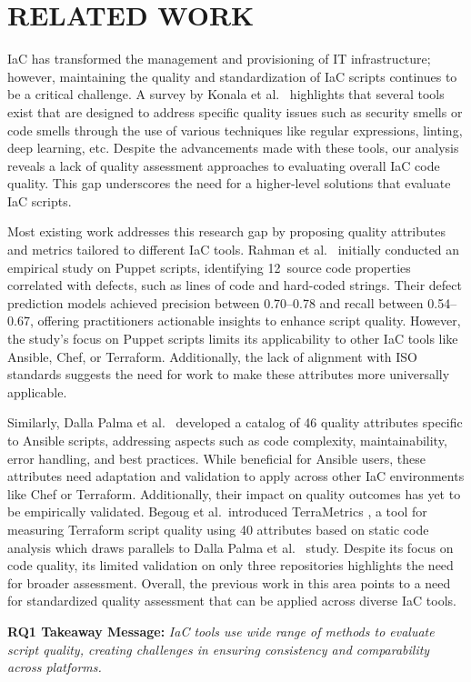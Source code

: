 \section{RELATED WORK}
IaC has transformed the management and provisioning of IT infrastructure; however, maintaining the quality and standardization of IaC scripts continues to be a critical challenge. A survey by Konala et al.\ \cite{pandusok} highlights that several tools exist that are designed to address specific quality issues such as security smells or code smells through the use of various techniques like regular expressions, linting, deep learning, etc. Despite the advancements made with these tools, our analysis reveals a lack of  quality assessment approaches to evaluating overall IaC code quality. This gap underscores the need for a higher-level solutions that evaluate IaC scripts.

Most existing work addresses this research gap by 
proposing quality attributes and metrics tailored to different IaC tools. Rahman et al.\ \cite{Rahman_2019} initially conducted an empirical study on Puppet scripts, identifying 12~source code properties correlated with defects, such as lines of code and hard-coded strings. Their defect prediction models achieved precision between 0.70--0.78 and recall between 0.54--0.67, offering practitioners actionable insights to enhance script quality. However, the study’s focus on Puppet scripts limits its applicability to other IaC tools like Ansible, Chef, or Terraform. Additionally, the lack of alignment with ISO standards suggests the need for work to make these attributes more universally applicable.

Similarly, Dalla Palma et al.\ \cite{Palma2020TowardsAC} developed a catalog of 46 quality attributes specific to Ansible scripts, addressing aspects such as code complexity, maintainability, error handling, and best practices. While beneficial for Ansible users, these attributes need adaptation and validation to apply across other IaC environments like Chef or Terraform. Additionally, their impact on quality outcomes has yet to be empirically validated. Begoug et al.\ introduced TerraMetrics \cite{TerraMetrics}, a tool for measuring Terraform script quality using 40 attributes based on static code analysis which draws parallels to Dalla Palma et al.\ \cite{Palma2020TowardsAC} study. Despite its focus on code quality, its limited validation on only three repositories highlights the need for broader assessment. Overall, the previous work in this area points to a need for standardized quality assessment that can be applied across diverse IaC tools.

\begin{tcolorbox}[
    colframe=SlateGray4, 
    colback=Snow1!20,  
    boxrule=1pt, 
    rounded corners
]
 \textbf{RQ1 Takeaway Message:} \textit{IaC tools use wide range of methods to evaluate script quality, creating challenges in ensuring consistency and comparability across platforms.}
\end{tcolorbox}